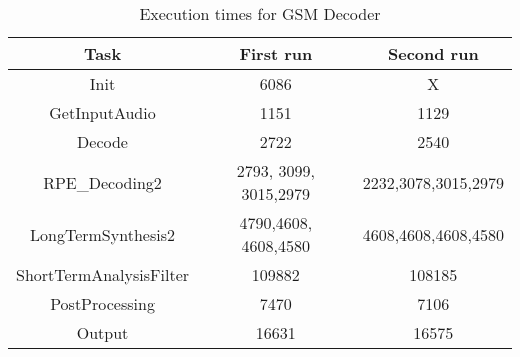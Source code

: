 \documentclass[a4paper, 12pt]{article}
\begin{document}
\begin{table}[h]
  \centering
  \begin{tabular}{c c c}
    \hline
    Task & First run & Second run \\
    \hline
    Init & 6086 & X \\
    GetInputAudio &1151 & 1129\\
    Decode & 2722& 2540\\
    RPE_Decoding2 & 2793, 3099, 3015,2979& 2232,3078,3015,2979\\
    LongTermSynthesis2 &4790,4608, 4608,4580& 4608,4608,4608,4580 \\
    ShortTermAnalysisFilter & 109882 & 108185\\
    PostProcessing & 7470& 7106\\
    Output & 16631& 16575\\
  \end{tabular}
  \caption{Execution times for GSM Decoder}
\end{table}
\end{document}
